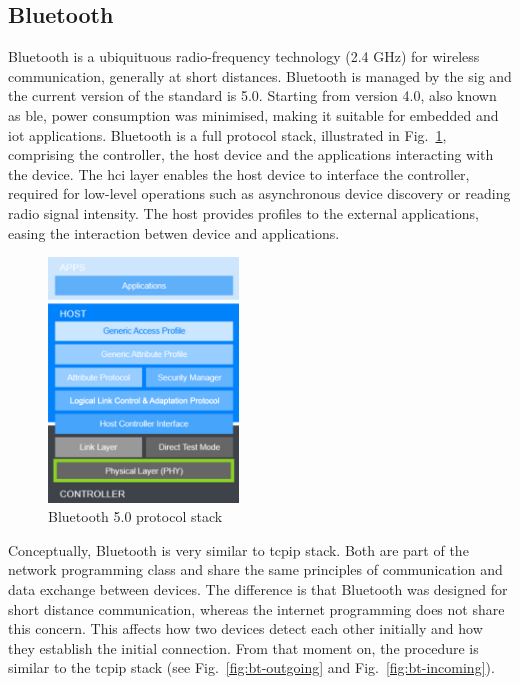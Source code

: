 \subsection{Bluetooth}%
\label{sec:bluetooth}
Bluetooth is a ubiquituous radio-frequency technology (2.4 GHz) for wireless
communication, generally at short distances. Bluetooth is managed by the
\gls{sig} and the current version of the standard
is 5.0. Starting from version 4.0, also known as \gls{ble}, power consumption
was minimised, making it suitable for embedded and \gls{iot}
applications. Bluetooth is a full protocol stack, illustrated in
Fig.~\ref{fig:ble-stack}, comprising the controller, the host device and the
applications interacting with the device. The \gls{hci} layer enables the host
device to interface the controller, required for low-level operations such as
asynchronous device discovery or reading radio signal intensity. The host
provides profiles to the external applications, easing the interaction betwen
device and applications.
%
\begin{figure}[!hbt]
\centering
\includegraphics[width=0.45\textwidth]{./img/ble-stack.png}
  \caption{Bluetooth 5.0 protocol stack}%
\label{fig:ble-stack}
\end{figure}
%
Conceptually, Bluetooth is very similar to \gls{tcpip} stack. Both are part of
the network programming class and share the same principles of communication and
data exchange between devices. The difference is that Bluetooth was designed for
short distance communication, whereas the internet programming does not share
this concern. This affects how two devices detect each other initially and how
they establish the initial connection. From that moment on, the procedure is
similar to the \gls{tcpip} stack (see Fig.~\ref{fig:bt-outgoing} and
Fig.~\ref{fig:bt-incoming}).
%
